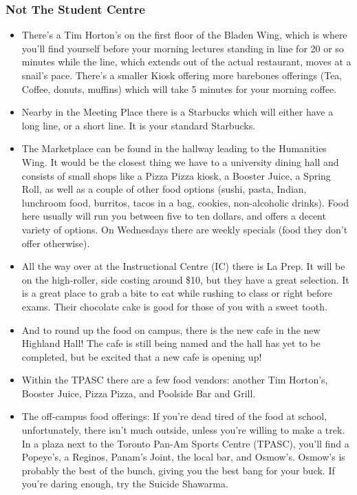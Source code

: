 \documentclass[11pt]{article}
\begin{document}
\subsubsection{Not The Student Centre}
\begin{itemize}
    \item There's a Tim Horton's on the first floor of the Bladen Wing, which is where you'll find yourself before your morning lectures standing in line for 20 or so minutes while the line, which extends out of the actual restaurant, moves at a snail's pace. There's a smaller Kiosk offering more barebones offerings (Tea, Coffee, donuts, muffins) which will take 5 minutes for your morning coffee.
    \item Nearby in the Meeting Place there is a Starbucks which will either have a long line, or a short line. It is your standard Starbucks.
    \item The Marketplace can be found in the hallway leading to the Humanities Wing. It would be the closest thing we have to a university dining hall and consists of small shops like a Pizza Pizza kiosk, a Booster Juice, a Spring Roll, as well as a couple of other food options (sushi, pasta, Indian, lunchroom food, burritos, tacos in a bag, cookies, non-alcoholic drinks). Food here usually will run you between five to ten dollars, and offers a decent variety of options. On Wednesdays there are weekly specials (food they don't offer otherwise).
    \item All the way over at the Instructional Centre (IC) there is La Prep. It will be on the high-roller, side costing around \$10, but they have a great selection. It is a great place to grab a bite to eat while rushing to class or right before exams. Their chocolate cake is good for those of you with a sweet tooth. \par
    \item And to round up the food on campus, there is the new cafe in the new Highland Hall! The cafe is still being named and the hall has yet to be completed, but be excited that a new cafe is opening up! \par
    \item Within the TPASC there are a few food vendors: another Tim Horton's, Booster Juice, Pizza Pizza, and Poolside Bar and Grill.
    \item The off-campus food offerings:  If you're dead tired of the food at school, unfortunately, there isn't much outside, unless you're willing to make a trek.  In a plaza next to the Toronto Pan-Am Sports Centre (TPASC), you'll find a Popeye's, a Reginos, Panam's Joint, the local bar, and Osmow's.  Osmow's is probably the best of the bunch, giving you the best bang for your buck.  If you're daring enough, try the Suicide Shawarma.
    
\end{itemize}
\end{document}
